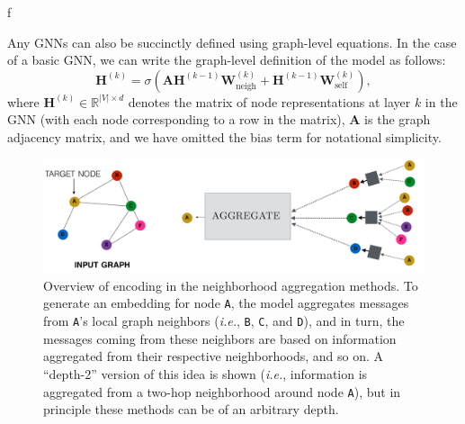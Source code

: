 \documentclass[10pt, aspectratio=169, compress, protectframetitle, handout]{beamer}
\begin{document}
\begin{frame}{f}
    
    Any GNNs can also be succinctly defined using graph-level equations. In the case of a basic GNN, we can write the graph-level definition of the model as follows:
    \begin{equation}
        \mathbf H^{(k)} = \sigma \left( \mathbf{A H}^{(k-1)} \mathbf W_\text{neigh}^{(k)} + \mathbf H^{(k-1)} \mathbf W_\text{self}^{(k)} \right),
    \end{equation}
    where $\mathbf H^{(k)} \in \mathbb R^{|V| \times d}$ denotes the matrix of node representations at layer $k$ in the GNN (with each node corresponding to a row in the matrix), $\mathbf A$ is the graph adjacency matrix, and we have omitted the bias term for notational simplicity.
    
    \begin{figure}
        \begin{minipage}{0.49\textwidth}
            \caption{Overview of encoding in the neighborhood aggregation methods.
            To generate an embedding for node \texttt{A}, the model aggregates messages from \texttt{A}'s local graph neighbors (\textit{i.e.}, \texttt{B}, \texttt{C}, and \texttt{D}), and in turn, the messages coming from these neighbors are based on information aggregated from their respective neighborhoods, and so on.
            A ``depth-2'' version of this idea is shown (\textit{i.e.}, information is aggregated from a two-hop neighborhood around node \texttt{A}), but in principle these methods can be of an arbitrary depth.
        }
        \end{minipage}
        \begin{minipage}[b]{0.49\textwidth}
            \includegraphics[width=1.1\textwidth]{neigh_agg_new.pdf}
        \end{minipage}
        \label{fig:neigh_agg}
    \end{figure}
    
\end{frame}
\end{document}

